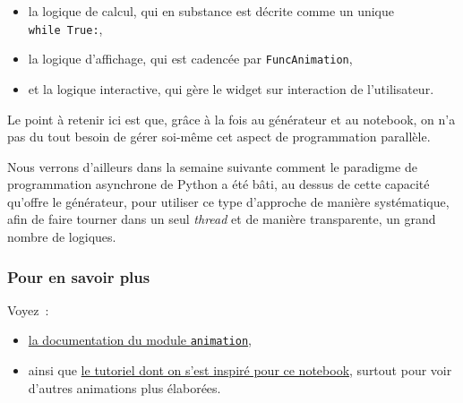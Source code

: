 \begin{itemize}
\tightlist
\item
  la logique de calcul, qui en substance est décrite comme un unique
  \texttt{while\ True:},
\item
  la logique d'affichage, qui est cadencée par \texttt{FuncAnimation},
\item
  et la logique interactive, qui gère le widget sur interaction de
  l'utilisateur.
\end{itemize}

Le point à retenir ici est que, grâce à la fois au générateur et au
notebook, on n'a pas du tout besoin de gérer soi-même cet aspect de
programmation parallèle.

Nous verrons d'ailleurs dans la semaine suivante comment le paradigme de
programmation asynchrone de Python a été bâti, au dessus de cette
capacité qu'offre le générateur, pour utiliser ce type d'approche de
manière systématique, afin de faire tourner dans un seul \emph{thread}
et de manière transparente, un grand nombre de logiques.

    \hypertarget{pour-en-savoir-plus}{%
\subsubsection{Pour en savoir plus}\label{pour-en-savoir-plus}}

Voyez~:

\begin{itemize}
\tightlist
\item
  \href{https://matplotlib.org/api/animation_api.html}{la documentation
  du module \texttt{animation}},
\item
  ainsi que
  \href{https://jakevdp.github.io/blog/2012/08/18/matplotlib-animation-tutorial/}{le
  tutoriel dont on s'est inspiré pour ce notebook}, surtout pour voir
  d'autres animations plus élaborées.
\end{itemize}


    
    
    
